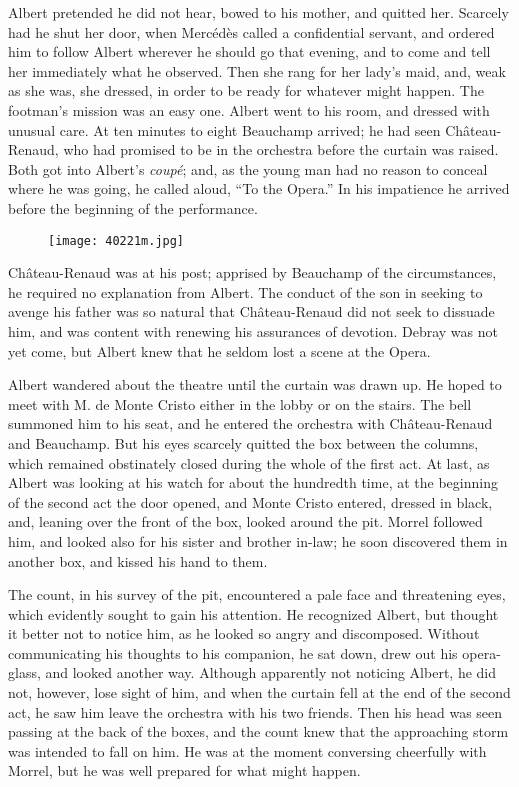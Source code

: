 Albert pretended he did not hear, bowed to his mother, and quitted her.
Scarcely had he shut her door, when Mercédès called a confidential
servant, and ordered him to follow Albert wherever he should go that
evening, and to come and tell her immediately what he observed. Then
she rang for her lady’s maid, and, weak as she was, she dressed, in
order to be ready for whatever might happen. The footman’s mission was
an easy one. Albert went to his room, and dressed with unusual care. At
ten minutes to eight Beauchamp arrived; he had seen Château-Renaud, who
had promised to be in the orchestra before the curtain was raised. Both
got into Albert’s \textit{coupé}; and, as the young man had no reason to
conceal where he was going, he called aloud, “To the Opera.” In his
impatience he arrived before the beginning of the performance.

\begin{figure}[ht]
\texttt{[image: 40221m.jpg]}
\end{figure}

Château-Renaud was at his post; apprised by Beauchamp of the
circumstances, he required no explanation from Albert. The conduct of
the son in seeking to avenge his father was so natural that
Château-Renaud did not seek to dissuade him, and was content with
renewing his assurances of devotion. Debray was not yet come, but
Albert knew that he seldom lost a scene at the Opera.

Albert wandered about the theatre until the curtain was drawn up. He
hoped to meet with M. de Monte Cristo either in the lobby or on the
stairs. The bell summoned him to his seat, and he entered the orchestra
with Château-Renaud and Beauchamp. But his eyes scarcely quitted the
box between the columns, which remained obstinately closed during the
whole of the first act. At last, as Albert was looking at his watch for
about the hundredth time, at the beginning of the second act the door
opened, and Monte Cristo entered, dressed in black, and, leaning over
the front of the box, looked around the pit. Morrel followed him, and
looked also for his sister and brother in-law; he soon discovered them
in another box, and kissed his hand to them.

The count, in his survey of the pit, encountered a pale face and
threatening eyes, which evidently sought to gain his attention. He
recognized Albert, but thought it better not to notice him, as he
looked so angry and discomposed. Without communicating his thoughts to
his companion, he sat down, drew out his opera-glass, and looked
another way. Although apparently not noticing Albert, he did not,
however, lose sight of him, and when the curtain fell at the end of the
second act, he saw him leave the orchestra with his two friends. Then
his head was seen passing at the back of the boxes, and the count knew
that the approaching storm was intended to fall on him. He was at the
moment conversing cheerfully with Morrel, but he was well prepared for
what might happen.

